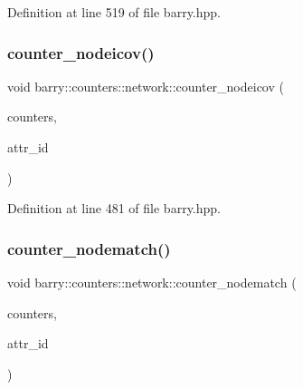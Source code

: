 Definition at line 519 of file barry.\+hpp.

\mbox{\label{namespacebarry_1_1counters_1_1network_aef48e4ae85d30c2a949006faee2b5bae}} 
\subsubsection{\texorpdfstring{counter\+\_\+nodeicov()}{counter\_nodeicov()}}
{\footnotesize\ttfamily void barry\+::counters\+::network\+::counter\+\_\+nodeicov (\begin{DoxyParamCaption}\item[{\hyperlink{namespacebarry_1_1counters_1_1network_a3b3c590303d47840d1967372ae495d95}{Net\+Counter\+Vector} $\ast$}]{counters,  }\item[{\hyperlink{namespacebarry_a11dfc53ddb4672278319aa04f1e09a6c}{uint}}]{attr\+\_\+id }\end{DoxyParamCaption})\hspace{0.3cm}{\ttfamily [inline]}}



Definition at line 481 of file barry.\+hpp.

\mbox{\label{namespacebarry_1_1counters_1_1network_ab0a33b2990950574552ab909e6847f96}} 
\subsubsection{\texorpdfstring{counter\+\_\+nodematch()}{counter\_nodematch()}}
{\footnotesize\ttfamily void barry\+::counters\+::network\+::counter\+\_\+nodematch (\begin{DoxyParamCaption}\item[{\hyperlink{namespacebarry_1_1counters_1_1network_a3b3c590303d47840d1967372ae495d95}{Net\+Counter\+Vector} $\ast$}]{counters,  }\item[{\hyperlink{namespacebarry_a11dfc53ddb4672278319aa04f1e09a6c}{uint}}]{attr\+\_\+id }\end{DoxyParamCaption})\hspace{0.3cm}{\ttfamily [inline]}}



